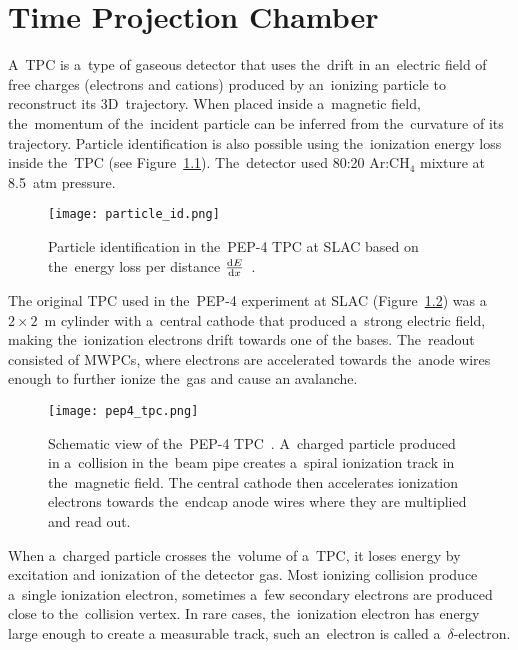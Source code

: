 \chapter{Time Projection Chamber}
\label{sec:tpc}
	A~\acf{TPC} is a~type of gaseous detector that uses the~drift in an~electric field of free charges (electrons and cations) produced by an~ionizing particle to reconstruct its 3D~trajectory. When placed inside a~magnetic field, the~momentum of the~incident particle can be inferred from the~curvature of its trajectory. Particle identification is also possible using the~ionization energy loss inside the~\ac{TPC} (see Figure~\ref{fig:particleid}). The~detector used 80:20 Ar:CH$_4$ mixture at 8.5~atm pressure.
	
	\begin{figure}[H]
		\centering
		\texttt{[image: particle\_id.png]}
		\caption{Particle identification in the~PEP-4 \ac{TPC} at SLAC based on the~energy loss per distance $\dv{E}{x}$~\cite{particleid}.}
		\label{fig:particleid}
	\end{figure}
	
	The original \ac{TPC} used in the~PEP-4 experiment at SLAC (Figure~\ref{fig:pep4}) was a $2\times2$~m cylinder with a~central cathode that produced a~strong electric field, making the~ionization electrons drift towards one of the bases. The~readout consisted of \ac{MWPC}s, where electrons are accelerated towards the~anode wires enough to further ionize the~gas and cause an avalanche.
	
	\begin{figure}
		\centering
		\texttt{[image: pep4\_tpc.png]}
		\caption{Schematic view of the~PEP-4 \ac{TPC}~\cite{pep4}. A~charged particle produced in a~collision in the~beam pipe creates a~spiral ionization track in the~magnetic field. The central cathode then accelerates ionization electrons towards the~endcap anode wires where they are multiplied and read out.}
		\label{fig:pep4}
	\end{figure}
	
	When a~charged particle crosses the~volume of a~\ac{TPC}, it loses energy by excitation and ionization of the detector gas. Most ionizing collision produce a~single ionization electron, sometimes a~few secondary electrons are produced close to the~collision vertex. In rare cases, the~ionization electron has energy large enough to create a measurable track, such an~electron is called a~$\delta$\nobreakdash-electron.
	
